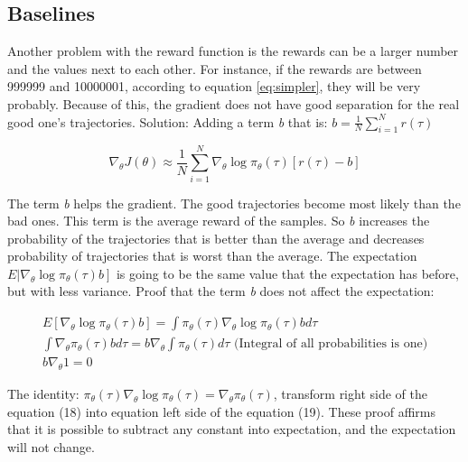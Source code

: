 \documentclass[]{article}
\begin{document}
\subsection*{Baselines}%
\label{sub:Baselines}

Another problem with the reward function is the rewards can be a larger number and the values next to each other. For
instance, if the rewards are between 999999 and 10000001, according to equation \eqref{eq:simpler}, they will be very
probably. Because of this, the gradient does not have good separation for the real good one's trajectories. Solution:
Adding a term \textit{b} that is: $b = \frac{1}{N}\sum_{i=1}^{N}r(\tau)$

\begin{equation}\nabla_{\theta} J(\theta) \approx \frac{1}{N} \sum_{i=1}^{N} \nabla_{\theta} \log \pi_{\theta}(\tau)[r(\tau)-b]\end{equation} 

The term \textit{b} helps the gradient. The good trajectories become most likely than the bad ones. This term is the
average reward of the samples. So \textit{b} increases the probability of the trajectories that is better than the
average and decreases probability of trajectories that is worst than the average.  The expectation $\left.E | \nabla_{\theta} \log \pi_{\theta}(\tau) b\right]$ is going to be
the same value that the expectation has before, but with less variance. Proof that the term \textit{b} does not affect
the expectation:

\begin{gather}
    E\left[\nabla_{\theta} \log \pi_{\theta}(\tau) b\right]=\int \pi_{\theta}(\tau) \nabla_{\theta}    \log\pi_{\theta}(\tau) b d \tau \\
    \int \nabla_{\theta} \pi_{\theta}(\tau) b d \tau=b \nabla_{\theta} \int \pi_{\theta}(\tau) d \tau \text{ (Integral of
    all probabilities is one)} \\
    b\nabla_{\theta}1 = 0
\end{gather}

The identity:  $\pi_{\theta}(\tau) \nabla_{\theta} \log \pi_{\theta}(\tau)=\nabla_{\theta} \pi_{\theta}(\tau)$,
transform right side of the equation (18) into equation left side of the equation (19). These proof affirms that it is
possible to subtract any constant into expectation, and the expectation will not change.
\end{document}
